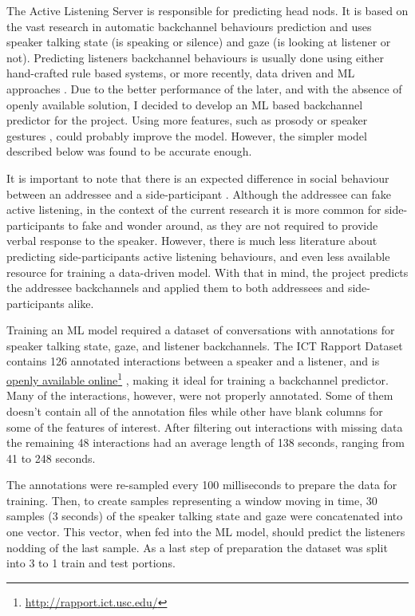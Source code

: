 \documentclass[]{simple-thesis}
\newcommand\fnurl[2]{%
  \href{#2}{#1}\footnote{\url{#2}}%
}
\begin{document}
The Active Listening Server is responsible for predicting head nods.
It is based on the vast research in automatic backchannel behaviours prediction and uses speaker talking state (is speaking or silence) and gaze (is looking at listener or not).
Predicting listeners backchannel behaviours is usually done using either hand-crafted rule based systems, or more recently, data driven and ML approaches \citep{Morency2008}.
Due to the better performance of the later, and with the absence of openly available solution, I decided to develop an ML based backchannel predictor for the project.
Using more features, such as prosody \citep{Ward2000} or speaker gestures \citep{Gratch2006}, could probably improve the model.
However, the simpler model described below was found to be accurate enough.

It is important to note that there is an expected difference in social behaviour between an addressee and a side-participant \citep{Clark1982, Healey2009, Battersby2010, Healey2013}.
Although the addressee can fake active listening, in the context of the current research it is more common for side-participants to fake and wonder around, as they are not required to provide verbal response to the speaker.
However, there is much less literature about predicting side-participants active listening behaviours, and even less available resource for training a data-driven model.
With that in mind, the project predicts the addressee backchannels and applied them to both addressees and side-participants alike.

Training an ML model required a dataset of conversations with annotations for speaker talking state, gaze, and listener backchannels.
The ICT Rapport Dataset \citep{Gratch2007} contains 126 annotated interactions between a speaker and a listener, and is \fnurl{openly available online}{http://rapport.ict.usc.edu/}, making it ideal for training a backchannel predictor.
Many of the interactions, however, were not properly annotated.
Some of them doesn't contain all of the annotation files while other have blank columns for some of the features of interest.
After filtering out interactions with missing data the remaining 48 interactions had an average length of 138 seconds, ranging from 41 to 248 seconds.

The annotations were re-sampled every 100 milliseconds to prepare the data for training.
Then, to create samples representing a window moving in time, 30 samples (3 seconds) of the speaker talking state and gaze were concatenated into one vector.
This vector, when fed into the ML model, should predict the listeners nodding of the last sample.
As a last step of preparation the dataset was split into 3 to 1 train and test portions.
\end{document}
